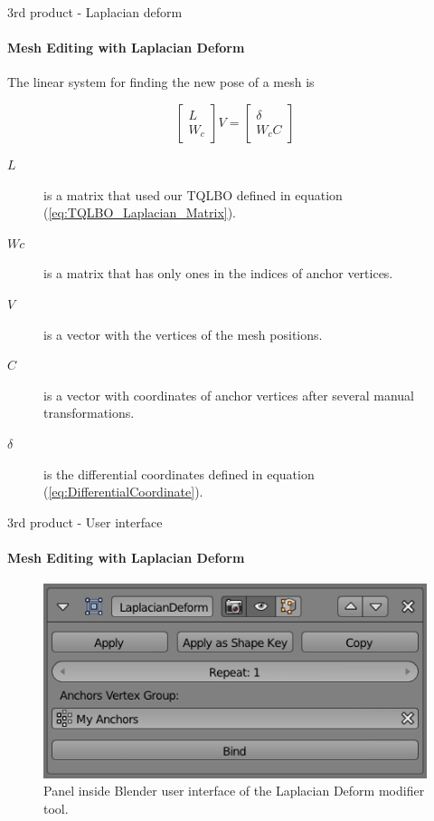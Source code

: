 \documentclass[10pt, compress, english]{beamer}
\begin{document}
\begin{frame}{3rd product - Laplacian deform}


\framesubtitle{Mesh Editing with Laplacian Deform}


The linear system for finding the new pose of a mesh is


\begin{equation}
\begin{bmatrix}L\\
W_{c}
\end{bmatrix}V=\begin{bmatrix}\delta\\
W_{c}C
\end{bmatrix}\label{eq:LaplacianDefomSystem}
\end{equation}

\begin{description}
\item [{$L$}] is a matrix that used our TQLBO defined in equation (\ref{eq:TQLBO_Laplacian_Matrix}). 
\item [{$Wc$}] is a matrix that has only ones in the indices of anchor
vertices. 
\item [{$V$}] is a vector with the vertices of the mesh positions.
\item [{$C$}] is a vector with coordinates of anchor vertices after several
manual transformations. 
\item [{$\delta$}] is the differential coordinates defined in equation
\textrm{(\ref{eq:DifferentialCoordinate}).}
\end{description}
\end{frame}

\begin{frame}{3rd product - User interface}


\framesubtitle{Mesh Editing with Laplacian Deform}


\noindent \begin{center}
\begin{figure}[H]
\noindent \begin{centering}
\includegraphics[width=0.7\columnwidth]{img/Apinzonf_Diagram_Deform_Modifier_Panel_01}
\par\end{centering}

\protect\caption{Panel inside Blender user interface of the Laplacian Deform modifier
tool.}
\end{figure}

\par\end{center}

\end{frame}
\end{document}
